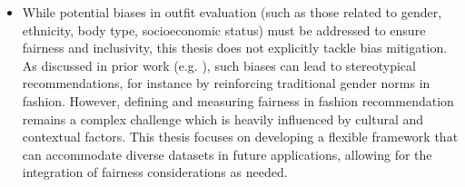 \begin{itemize}
  \item While potential biases in outfit evaluation (such as those related to gender, ethnicity, body type, socioeconomic status) must be addressed to ensure fairness and inclusivity, this thesis does not explicitly tackle bias mitigation. As discussed in prior work (e.g. \cite[vgl.]{deldjoo_review_2022}), such biases can lead to stereotypical recommendations, for instance by reinforcing traditional gender norms in fashion. However, defining and measuring fairness in fashion recommendation remains a complex challenge which is heavily influenced by cultural and contextual factors. This thesis focuses on developing a flexible framework that can accommodate diverse datasets in future applications, allowing for the integration of fairness considerations as needed.
\end{itemize}

